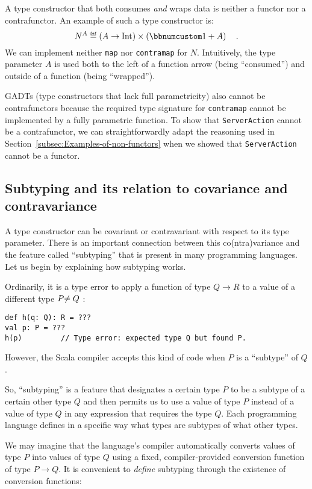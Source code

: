 A type constructor that both consumes \emph{and} wraps data is neither
a functor nor a contrafunctor. An example of such a type constructor
is:
\[
N^{A}\triangleq\left(A\rightarrow\text{Int}\right)\times\left(\bbnum 1+A\right)\quad.
\]
We can implement neither \lstinline!map! nor \lstinline!contramap!
for $N$. Intuitively, the type parameter $A$ is used both to the
left of a function arrow (being \textsf{``}consumed\textsf{''}) and outside of a function
(being \textsf{``}wrapped\textsf{''}).

GADTs (type constructors that lack full parametricity)
also cannot be contrafunctors because the required type signature
for \lstinline!contramap! cannot be implemented by a fully parametric
function. To show that \lstinline!ServerAction! cannot be a contrafunctor,
we can straightforwardly adapt the reasoning used in Section~\ref{subsec:Examples-of-non-functors}
when we showed that \lstinline!ServerAction! cannot be a functor.

\subsection{Subtyping and its relation to covariance and contravariance\label{subsec:Covariance,-contravariance,-and-subtyping}}

A type constructor can be covariant or contravariant with respect
to its type parameter. There is an important connection between this
co(ntra)variance and the feature called \textsf{``}subtyping\textsf{''} that is present
in many programming languages. Let us begin by explaining how subtyping
works.

Ordinarily, it is a type error to apply a function of type $Q\rightarrow R$
to a value of a different type $P\text{\ensuremath{\neq Q}}$ :
\begin{lstlisting}
def h(q: Q): R = ???
val p: P = ???
h(p)         // Type error: expected type Q but found P.
\end{lstlisting}
However, the Scala compiler accepts this kind of code when $P$ is
a \textsf{``}subtype\textsf{''} of $Q$. 

So, \textsf{``}subtyping\textsf{''} is a feature that designates a certain type $P$
to be a subtype of a certain other type $Q$ and then permits us to
use a value of type $P$ instead of a value of type $Q$ in any expression
that requires the type $Q$. Each programming language defines in
a specific way what types are subtypes of what other types. 

We may imagine that the language\textsf{'}s compiler automatically converts
values of type $P$ into values of type $Q$ using a fixed, compiler-provided
conversion function of type $P\rightarrow Q$. It is convenient to
\emph{define} subtyping through the existence of conversion functions:


